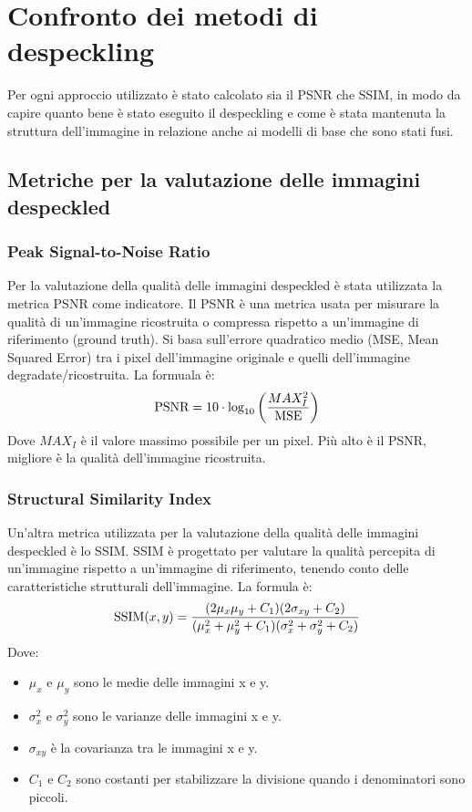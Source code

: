 \chapter{Confronto dei metodi di despeckling}
Per ogni approccio utilizzato è stato calcolato sia il PSNR che SSIM, in modo da capire 
quanto bene è stato eseguito il despeckling e come è 
stata mantenuta la struttura dell'immagine in relazione anche ai modelli di base che sono stati fusi.

\section{Metriche per la valutazione delle immagini despeckled}
\subsection{Peak Signal-to-Noise Ratio}
Per la valutazione della qualità delle immagini despeckled è stata utilizzata la metrica PSNR come indicatore.
Il PSNR è una metrica usata per misurare la qualità di un’immagine ricostruita o 
compressa rispetto a un’immagine di riferimento (ground truth). 
Si basa sull’errore quadratico medio (MSE, Mean Squared Error) tra i pixel dell’immagine originale e 
quelli dell’immagine degradate/ricostruita. La formuala è: 
\begin{equation}
  \makebox[\textwidth][c]{%
    $\displaystyle
    \text{PSNR} = 10 \cdot \log_{10} \left( \frac{MAX_I^2}{\text{MSE}} \right)
    $%
  }
\end{equation}
Dove $MAX_I$ è il valore massimo possibile per un pixel. Più alto è il PSNR, migliore è la qualità dell’immagine ricostruita.
\subsection{Structural Similarity Index}
Un’altra metrica utilizzata per la valutazione della qualità delle immagini despeckled è lo SSIM. 
SSIM è progettato per valutare la qualità percepita di un’immagine rispetto a un’immagine di riferimento, 
tenendo conto delle caratteristiche strutturali dell’immagine. La formula è:
\begin{equation}
  \makebox[\textwidth][c]{%
    $\displaystyle
    \text{SSIM}(x, y) = \frac{(2\mu_x \mu_y + C_1)(2\sigma_{xy} + C_2)}{(\mu_x^2 + \mu_y^2 + C_1)(\sigma_x^2 + \sigma_y^2 + C_2)}
    $%
  }
\end{equation}
Dove:
\begin{itemize}
  \item $\mu_x$ e $\mu_y$ sono le medie delle immagini x e y.
  \item $\sigma_x^2$ e $\sigma_y^2$ sono le varianze delle immagini x e y.
  \item $\sigma_{xy}$ è la covarianza tra le immagini x e y.
  \item $C_1$ e $C_2$ sono costanti per stabilizzare la divisione quando i denominatori sono piccoli.   
\end{itemize}


